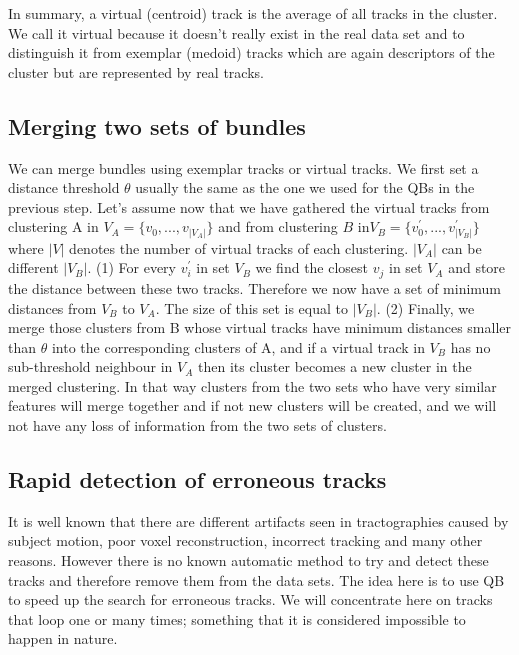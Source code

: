 \documentclass[preprint,authoryear,a4paper,10pt,onecolumn]{elsarticle}
\begin{document}
In summary, a virtual (centroid) track is the average of all tracks in
the cluster. We call it virtual because it doesn't really exist in the
real data set and to distinguish it from exemplar (medoid) tracks which
are again descriptors of the cluster but are represented by real tracks.


\subsection{Merging two sets of bundles\label{sub:merging}}

We can merge bundles using exemplar tracks or virtual tracks. We first
set a distance threshold $\theta$ usually the same as the one we used
for the QBs in the previous step. Let's assume now that we have gathered
the virtual tracks from clustering A in
$V_{A}=\{v_{0},...,v_{|V_{A}|}\}$ and from clustering $B$
in$V_{B}=\{v_{0}^{'},...,v_{|V_{B}|}^{'}\}$ where $|V|$ denotes the
number of virtual tracks of each clustering.  $|V_{A}|$ can be different
$|V_{B}|$. (1) For every $v_{i}^{'}$ in set $V_{B}$ we find the closest
$v_{j}$ in set $V_{A}$ and store the distance between these two
tracks. Therefore we now have a set of minimum distances from $V_{B}$ to
$V_{A}$. The size of this set is equal to $|V_{B}|$. (2) Finally, we
merge those clusters from B whose virtual tracks have minimum
distances smaller than $\theta$ into the corresponding clusters of A,
and if a virtual track in $V_{B}$ has no sub-threshold neighbour in
$V_{A}$ then its cluster becomes a new cluster in the merged
clustering. In that way clusters from the two sets who have very similar
features will merge together and if not new clusters will be created,
and we will not have any loss of information from the two sets of
clusters.

\subsection{Rapid detection of erroneous tracks}

It is well known that there are different artifacts seen in
tractographies caused by subject motion, poor voxel reconstruction,
incorrect tracking and many other reasons. However there is no known
automatic method to try and detect these tracks and therefore remove
them from the data sets. The idea here is to use QB to speed up the
search for erroneous tracks. We will concentrate here on tracks that
loop one or many times; something that it is considered impossible to
happen in nature.
\end{document}
